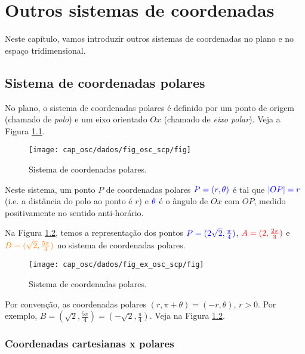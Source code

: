 

\chapter{Outros sistemas de coordenadas}\label{cap_osc}
\thispagestyle{fancy}

Neste capítulo, vamos introduzir outros sistemas de coordenadas no plano e no espaço tridimensional.

\section{Sistema de coordenadas polares}\label{cap_osc_scp}

No plano, o sistema de coordenadas polares é definido por um ponto de origem (chamado de \emph{polo}) e um eixo orientado $Ox$ (chamado de \emph{eixo polar}). Veja a Figura \ref{fig:osc_scp}.

\begin{figure}[H]
  \centering
  \texttt{[image: cap\_osc/dados/fig\_osc\_scp/fig]}
  \caption{Sistema de coordenadas polares.}
  \label{fig:osc_scp}
\end{figure}

Neste sistema, um ponto $P$ de coordenadas polares ${\color{blue}P=(r, \theta)}$ é tal que ${\color{blue}|OP| = r}$ (i.e. a distância do polo ao ponto é $r$) e ${\color{blue}\theta}$ é o ângulo de $Ox$ com $OP$, medido positivamente no sentido anti-horário.

\begin{ex}
  Na Figura \ref{fig:ex_osc_scp}, temos a representação dos pontos ${\color{blue}P=(2\sqrt{2}, \frac{\pi}{4})}$, ${\color{red}A=(2, \frac{2\pi}{3})}$ e ${\color{orange}B=(\sqrt{2}, \frac{5\pi}{4})}$ no sistema de coordenadas polares.

\begin{figure}[H]
  \centering
  \texttt{[image: cap\_osc/dados/fig\_ex\_osc\_scp/fig]}
  \caption{Sistema de coordenadas polares.}
  \label{fig:ex_osc_scp}
\end{figure}  
\end{ex}

\begin{obs}
  Por convenção, as coordenadas polares $(r, \pi + \theta) = (-r, \theta)$, $r>0$. Por exemplo, $B=(\sqrt{2}, \frac{5\pi}{4}) = (-\sqrt{2}, \frac{\pi}{4})$. Veja na Figura \ref{fig:ex_osc_scp}.
\end{obs}

\subsection{Coordenadas cartesianas x polares}

